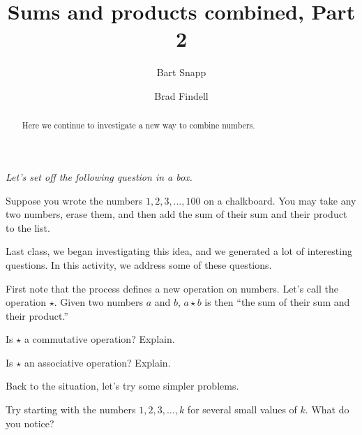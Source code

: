 \documentclass{ximera}
\title{Sums and products combined, Part 2}
\author{Bart Snapp \and Brad Findell}
\begin{document}
\begin{abstract}
Here we continue to investigate a new way to combine numbers.
\end{abstract}
\maketitle

\emph{Let's set off the following question in a box.} 

Suppose you wrote the numbers $1,2,3,\dots,100$ on a chalkboard. You
may take any two numbers, erase them, and then add the sum of their
sum and their product to the list.

Last class, we began investigating this idea, and we generated a lot of interesting questions.  
In this activity, we address some of these questions.  

First note that the process defines a new operation on numbers.  Let's call the operation $\star$.  Given two numbers $a$ and $b$,  $a\star b$ is then ``the sum of their sum and their product.''    

\begin{problem}
Is $\star$ a commutative operation?  Explain.  
\begin{freeResponse}
\end{freeResponse}
\vfill
\end{problem}

\begin{problem}
Is $\star$ an associative operation?  Explain.  
\begin{freeResponse}
%
\end{freeResponse}
\vfill
\end{problem}

\newpage
Back to the situation, let's try some simpler problems.  

\begin{problem}
Try starting with the numbers $1,2,3,\dots, k$ for several small values of $k$.  What do you notice?  
\begin{freeResponse}
\end{freeResponse}
\vfill
\end{problem}
\end{document}
